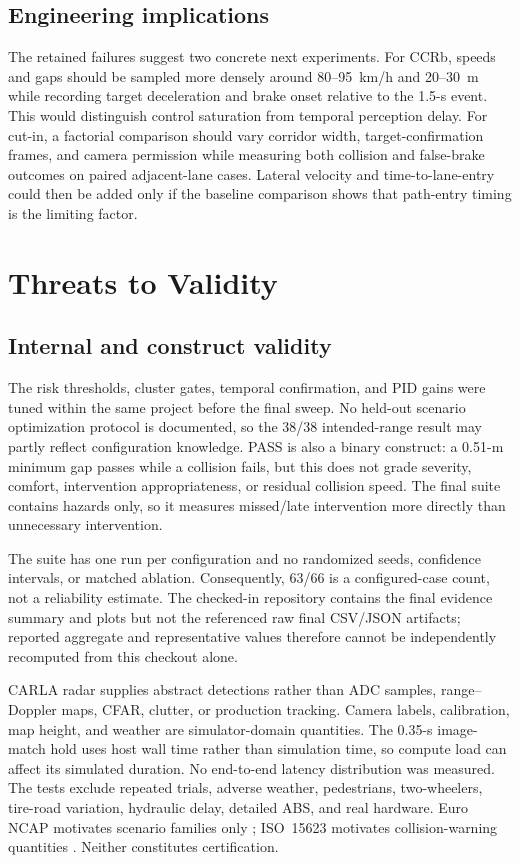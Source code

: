 \documentclass[conference]{IEEEtran}
\begin{document}
\subsection{Engineering implications}
The retained failures suggest two concrete next experiments. For CCRb, speeds
and gaps should be sampled more densely around 80--95~km/h and 20--30~m while
recording target deceleration and brake onset relative to the 1.5-s event. This
would distinguish control saturation from temporal perception delay. For cut-in,
a factorial comparison should vary corridor width, target-confirmation frames,
and camera permission while measuring both collision and false-brake outcomes
on paired adjacent-lane cases. Lateral velocity and time-to-lane-entry could then
be added only if the baseline comparison shows that path-entry timing is the
limiting factor.

\section{Threats to Validity}
\subsection{Internal and construct validity}
The risk thresholds, cluster gates, temporal confirmation, and PID gains were
tuned within the same project before the final sweep. No held-out scenario
optimization protocol is documented, so the 38/38 intended-range result may
partly reflect configuration knowledge. PASS is also a binary construct: a
0.51-m minimum gap passes while a collision fails, but this does not grade
severity, comfort, intervention appropriateness, or residual collision speed.
The final suite contains hazards only, so it measures missed/late intervention
more directly than unnecessary intervention.

The suite has one run per configuration and no randomized seeds, confidence
intervals, or matched ablation. Consequently, 63/66 is a configured-case count,
not a reliability estimate. The checked-in repository contains the final
evidence summary and plots but not the referenced raw final CSV/JSON artifacts;
reported aggregate and representative values therefore cannot be independently
recomputed from this checkout alone.

CARLA radar supplies abstract detections rather than ADC samples, range--Doppler
maps, CFAR, clutter, or production tracking. Camera labels, calibration, map
height, and weather are simulator-domain quantities. The 0.35-s image-match hold
uses host wall time rather than simulation time, so compute load can affect its
simulated duration. No end-to-end latency distribution was measured. The tests
exclude repeated trials, adverse weather, pedestrians, two-wheelers, tire-road
variation, hydraulic delay, detailed ABS, and real hardware. Euro NCAP motivates
scenario families only \cite{euroncap_aeb}; ISO~15623 motivates collision-warning
quantities \cite{iso15623}. Neither constitutes certification.
\end{document}
